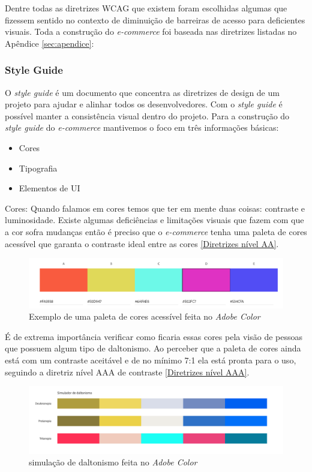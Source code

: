 {Dentre todas as diretrizes WCAG \cite{WCAG} que existem foram escolhidas algumas que fizessem sentido no contexto de diminuição de barreiras de acesso para deficientes visuais. Toda a construção do \textit{e-commerce} foi baseada nas diretrizes listadas no Apêndice \ref{sec:apendice}: 

}

\newpage
\subsubsection{Style Guide}
{O \textit{style guide} \cite{STYLE} é um documento que concentra as diretrizes de design de um projeto para ajudar e alinhar todos os desenvolvedores. Com o \textit{style guide} é possível manter a consistência visual dentro do projeto. Para a construção do \textit{style guide} do \textit{e-commerce} mantivemos o foco em três informações básicas:
\begin{itemize}
\item Cores
\item Tipografia
\item Elementos de UI
\end{itemize}

\vspace*{20px}
Cores:  Quando falamos em cores temos que ter em mente duas coisas: contraste e luminosidade. Existe algumas deficiências e limitações visuais que fazem com que a cor sofra mudanças então é preciso que o \textit{e-commerce} tenha uma paleta de cores acessível que garanta o contraste ideal entre as cores \ref{Diretrizes nível AA}. 
\begin{figure}[ht]
  		\centering
        \includegraphics[width=1.0\textwidth]{images/paleta_de_cores_acessiveis.png}
        \caption{Exemplo de uma paleta de cores acessível feita no \textit{Adobe Color}}
\end{figure}  
 
\vspace*{50px}
É de extrema importância verificar como ficaria essas cores pela visão de pessoas que possuem algum tipo de daltonismo. Ao perceber que a paleta de cores ainda está com um contraste aceitável e de no mínimo 7:1 ela está pronta para o uso, seguindo a diretriz nível AAA de contraste \ref{Diretrizes nível AAA}. 
 \begin{figure}[ht]
        \centering
    	\includegraphics[width=1.0\textwidth]{images/paleta_daltonismo.png}
        \caption{simulação de daltonismo feita no \textit{Adobe Color}}
\end{figure}  


}
